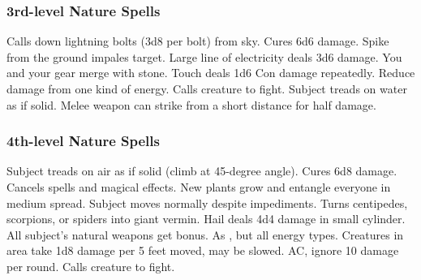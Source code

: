 \subsubsection{3rd-level Nature Spells}
\begin{spelllist}
   Calls down lightning bolts (3d8 per bolt) from sky.
   Cures 6d6 damage.
   Spike from the ground impales target.
   Large line of electricity deals 3d6 damage.
   You and your gear merge with stone.
   Touch deals 1d6 Con damage repeatedly.
   Reduce damage from one kind of energy.
   Calls creature to fight.
   Subject treads on water as if solid.
   Melee weapon can strike from a short distance for half damage.
\end{spelllist}

\subsubsection{4th-level Nature Spells}
\begin{spelllist}
   Subject treads on air as if solid (climb at 45-degree angle).
   Cures 6d8 damage.
   Cancels spells and magical effects.
   New plants grow and entangle everyone in medium spread.
   Subject moves normally despite impediments.
   Turns centipedes, scorpions, or spiders into giant vermin.
   Hail deals 4d4 damage in small cylinder.
   All subject's natural weapons get  bonus.
   As , but all energy types.
   Creatures in area take 1d8 damage per 5 feet moved, may be slowed.
    AC, ignore 10 damage per round.
   Calls creature to fight.
\end{spelllist}

